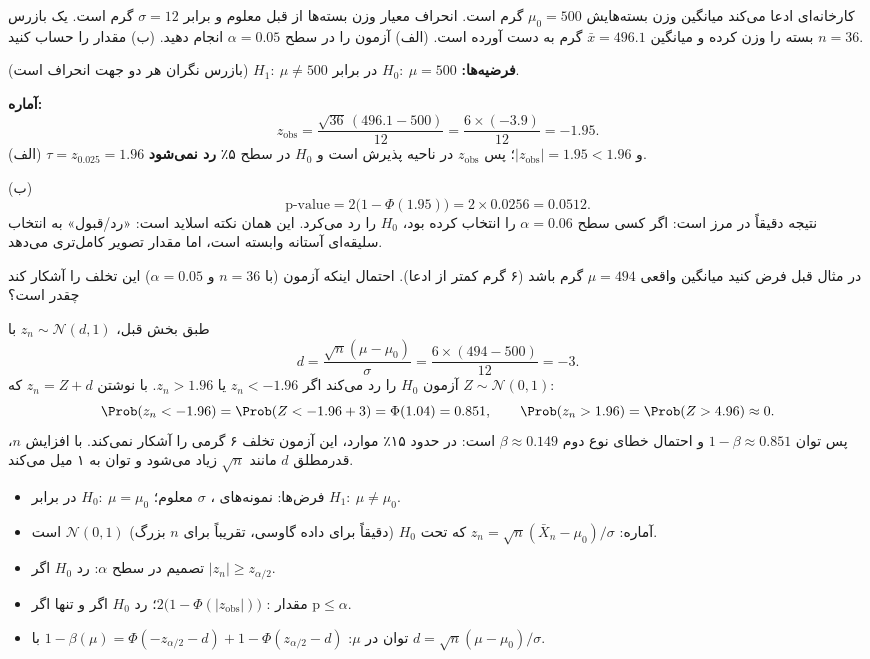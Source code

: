 \begin{example}
کارخانه‌ای ادعا می‌کند میانگین وزن بسته‌هایش $\mu_0=500$ گرم است. انحراف معیار وزن بسته‌ها از قبل معلوم و برابر $\sigma=12$ گرم است. یک بازرس $n=36$ بسته را وزن کرده و میانگین $\bar x=496.1$ گرم به دست آورده است. (الف) آزمون را در سطح $\alpha=0.05$ انجام دهید. (ب) مقدار  را حساب کنید.
\begin{solution}
\textbf{فرضیه‌ها:} $H_0:\ \mu=500$ در برابر $H_1:\ \mu\neq500$ (بازرس نگران هر دو جهت انحراف است).

\textbf{آماره:}
\[
z_{\text{obs}}=\frac{\sqrt{36}\,(496.1-500)}{12}=\frac{6\times(-3.9)}{12}=-1.95 .
\]
(الف) $\tau=z_{0.025}=1.96$ و $|z_{\text{obs}}|=1.95<1.96$؛ پس $z_{\text{obs}}$ در ناحیه پذیرش است و $H_0$ در سطح ۵٪ \textbf{رد نمی‌شود}.

(ب)
\[
\text{p-value}=2\big(1-\Phi(1.95)\big)=2\times0.0256=0.0512 .
\]
نتیجه دقیقاً در مرز است: اگر کسی سطح $\alpha=0.06$ را انتخاب کرده بود، $H_0$ را رد می‌کرد. این همان نکته اسلاید است: «رد/قبول» به انتخاب سلیقه‌ای آستانه وابسته است، اما مقدار  تصویر کامل‌تری می‌دهد.
\end{solution}
\end{example}

\begin{example}
در مثال قبل فرض کنید میانگین واقعی $\mu=494$ گرم باشد (۶ گرم کمتر از ادعا). احتمال اینکه آزمون (با $n=36$ و $\alpha=0.05$) این تخلف را آشکار کند چقدر است؟
\begin{solution}
طبق بخش قبل، $z_n\sim\mathcal N(d,1)$ با
\[
d=\frac{\sqrt n(\mu-\mu_0)}{\sigma}=\frac{6\times(494-500)}{12}=-3 .
\]
آزمون $H_0$ را رد می‌کند اگر $z_n<-1.96$ یا $z_n>1.96$. با نوشتن $z_n=Z+d$ که $Z\sim\mathcal N(0,1)$:
\[
\Prob(z_n<-1.96)=\Prob(Z<-1.96+3)=\Phi(1.04)=0.851,\qquad\Prob(z_n>1.96)=\Prob(Z>4.96)\approx0 .
\]
پس توان $1-\beta\approx0.851$ و احتمال خطای نوع دوم $\beta\approx0.149$ است: در حدود ۱۵٪ موارد، این آزمون تخلف ۶ گرمی را آشکار نمی‌کند. با افزایش $n$، قدرمطلق $d$ مانند $\sqrt n$ زیاد می‌شود و توان به ۱ میل می‌کند.
\end{solution}
\end{example}

\begin{summarybox}
\begin{itemize}
\item فرض‌ها: نمونه‌های ، $\sigma$ معلوم؛ $H_0:\ \mu=\mu_0$ در برابر $H_1:\ \mu\neq\mu_0$.
\item آماره: $z_n=\sqrt n(\bar X_n-\mu_0)/\sigma$ که تحت $H_0$ (دقیقاً برای داده گاوسی، تقریباً برای $n$ بزرگ) $\mathcal N(0,1)$ است.
\item تصمیم در سطح $\alpha$: رد $H_0$ اگر $|z_n|\ge z_{\alpha/2}$.
\item مقدار : $2\big(1-\Phi(|z_{\text{obs}}|)\big)$؛ رد $H_0$ اگر و تنها اگر $\text{p}\le\alpha$.
\item توان در $\mu$: $1-\beta(\mu)=\Phi(-z_{\alpha/2}-d)+1-\Phi(z_{\alpha/2}-d)$ با $d=\sqrt n(\mu-\mu_0)/\sigma$.
\end{itemize}
\end{summarybox}

